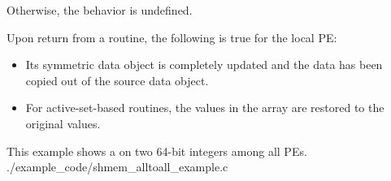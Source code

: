 \begin{apidefinition}
{\begin{DeprecateBlock}
    Otherwise, the behavior is undefined.

    Upon return from a  routine, the following is true for
    the local PE:
    \begin{itemize}
    	\item Its  symmetric data object is completely updated and the 
	data has been copied out of the source data object.
    	\item For active-set-based routines,
    	the values in the  array are restored to the original values.
    \end{itemize}
\end{DeprecateBlock}
}


\begin{apiexamples}

\apicexample
    {This \CorCpp{} example shows a  on two 64-bit integers among all
    \acp{PE}.}
    {./example_code/shmem_alltoall_example.c}
    {}

\end{apiexamples}

\end{apidefinition}

